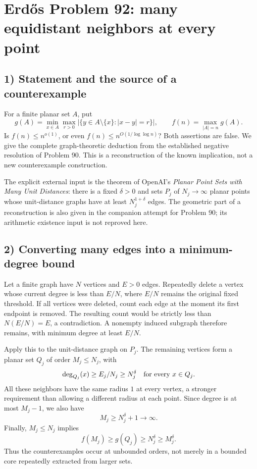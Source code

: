 \section{Erd\H{o}s Problem 92: many equidistant neighbors at every point}

\subsection{1) Statement and the source of a counterexample}
For a finite planar set $A$, put
\[
 g(A)=\min_{x\in A}\max_{r>0}
       |\{y\in A\setminus\{x\}:|x-y|=r\}|,
 \qquad f(n)=\max_{|A|=n}g(A).
\]
Is $f(n)\leq n^{o(1)}$, or even
$f(n)\leq n^{O(1/\log\log n)}$? Both assertions are false.
We give the complete graph-theoretic deduction from the established
negative resolution of Problem 90. This is a reconstruction of the
known implication, not a new counterexample construction.

The explicit external input is the theorem of OpenAI's
\emph{Planar Point Sets with Many Unit Distances}: there is a
fixed $\delta>0$ and sets $P_j$ of $N_j\to\infty$ planar points
whose unit-distance graphs have at least $N_j^{1+\delta}$ edges.
The geometric part of a reconstruction is also given in the
companion attempt for Problem 90; its arithmetic existence input
is not reproved here.

\subsection{2) Converting many edges into a minimum-degree bound}
Let a finite graph have $N$ vertices and $E>0$ edges. Repeatedly
delete a vertex whose current degree is less than $E/N$, where
$E/N$ remains the original fixed threshold. If all vertices were
deleted, count each edge at the moment its first endpoint is removed.
The resulting count would be strictly less than
$N(E/N)=E$, a contradiction. A nonempty induced subgraph therefore
remains, with minimum degree at least $E/N$.

Apply this to the unit-distance graph on $P_j$. The remaining
vertices form a planar set $Q_j$ of order $M_j\leq N_j$, with
\[
 \deg_{Q_j}(x)\geq E_j/N_j\geq N_j^\delta
       \quad\hbox{for every }x\in Q_j.
\]
All these neighbors have the same radius $1$ at every vertex, a
stronger requirement than allowing a different radius at each point.
Since degree is at most $M_j-1$, we also have
\[
 M_j\geq N_j^\delta+1\longrightarrow\infty.
\]
Finally, $M_j\leq N_j$ implies
\[
 f(M_j)\geq g(Q_j)\geq N_j^\delta\geq M_j^\delta.
\]
Thus the counterexamples occur at unbounded orders, not merely in
a bounded core repeatedly extracted from larger sets.

